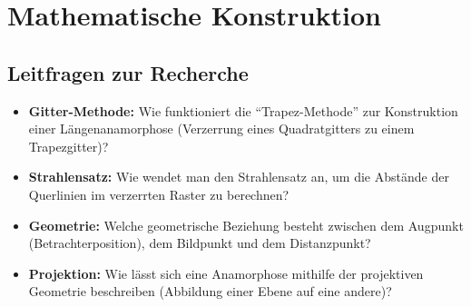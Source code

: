 \section{Mathematische Konstruktion}

\subsection*{Leitfragen zur Recherche}
\begin{itemize}
    \item \textbf{Gitter-Methode:} Wie funktioniert die \enquote{Trapez-Methode} zur Konstruktion einer Längenanamorphose (Verzerrung eines Quadratgitters zu einem Trapezgitter)?
    \item \textbf{Strahlensatz:} Wie wendet man den Strahlensatz an, um die Abstände der Querlinien im verzerrten Raster zu berechnen?
    \item \textbf{Geometrie:} Welche geometrische Beziehung besteht zwischen dem Augpunkt (Betrachterposition), dem Bildpunkt und dem Distanzpunkt?
    \item \textbf{Projektion:} Wie lässt sich eine Anamorphose mithilfe der projektiven Geometrie beschreiben (Abbildung einer Ebene auf eine andere)?
\end{itemize}

